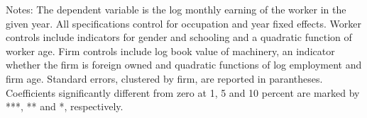 \begin{tablenotes}
\item \footnotesize Notes: The dependent variable is the log monthly earning of the worker in the given year. All specifications control for occupation and year fixed effects. Worker controls include indicators for gender and schooling and a quadratic function of worker age. Firm controls include log book value of machinery, an indicator whether the firm is foreign owned and quadratic functions of log employment and firm age. Standard errors, clustered by firm, are reported in parantheses. Coefficients significantly different from zero at 1, 5 and 10 percent are marked by ***, ** and *, respectively.

\end{tablenotes} 